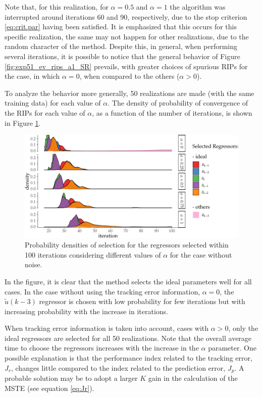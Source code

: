\begin{exmp}
Note that, for this realization, for $\alpha=0.5$ and $\alpha=1$ the algorithm was interrupted around iterations 60 and 90, respectively, due to the stop criterion \eqref{eq:crit.par} having been satisfied. It is emphasized that this occurs for this specific realization, the same may not happen for other realizations, due to the random character of the method.
Despite this, in general, when performing several iterations, it is possible to notice that the general behavior of Figure \ref{fig:exp51_ev_rips_a1_SR} prevails, with greater choices of spurious RIPs for the case, in which $\alpha=0$, when compared to the others ($\alpha>0$).

To analyze the behavior more generally, 50 realizations are made (with the same training data) for each value of $\alpha$. The density of probability of convergence of the RIPs for each value of $\alpha$, as a function of the number of iterations, is shown in Figure \ref{fig:exp51_dens_prob_SR}.
\begin{figure}[htpb]
  \centering
  \includegraphics{Figs/Cap5/ex51_iter_con_SEM_ruido.tex.pdf}
  \caption{Probability densities of selection for the regressors selected within 100 iterations considering different values of $\alpha$ for the case without noise.}
  \label{fig:exp51_dens_prob_SR}
\end{figure}
In the figure, it is clear that the method selects the ideal parameters well for all cases. In the case without using the tracking error information, $\alpha=0$, the $\tilde{u}(k-3)$ regressor is chosen with low probability for few iterations but with increasing probability with the increase in iterations.

When tracking error information is taken into account, cases with $\alpha>0$, only the ideal regressors are selected for all 50 realizations. Note that the overall average time to choose the regressors increases with the increase in the $\alpha$ parameter. One possible explanation is that the performance index related to the tracking error, $J_r$, changes little compared to the index related to the prediction error, $J_p$. A probable solution may be to adopt a larger $K$ gain in the calculation of the MSTE (see equation \ref{eq:Jr}).


\end{exmp}
